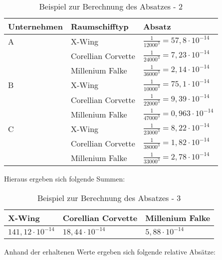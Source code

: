 \begin{table}[htb]
     \centering
     \begin{tabular}{ | l | l | l | }
          \hline
          Unternehmen & Raumschifftyp & Absatz \\
          \hline \hline
         A & X-Wing & $\frac{1}{12000^3} = 57,8 \cdot 10^{-14}$  \\
           & Corellian Corvette & $\frac{1}{24000^3} = 7,23 \cdot 10^{-14}$ \\
           & Millenium Falke & $\frac{1}{36000^3} = 2,14 \cdot 10^{-14}$ \\ \hline
         B & X-Wing & $\frac{1}{10000^3} = 75,1 \cdot 10^{-14}$ \\
           & Corellian Corvette & $\frac{1}{22000^3} = 9,39 \cdot 10^{-14}$ \\
           & Millenium Falke & $\frac{1}{47000^3} = 0,963 \cdot 10^{-14}$ \\ \hline
         C & X-Wing & $\frac{1}{23000^3} = 8,22 \cdot 10^{-14}$ \\
           & Corellian Corvette & $\frac{1}{38000^3} = 1,82 \cdot 10^{-14}$ \\
           & Millenium Falke & $\frac{1}{33000^3} = 2,78 \cdot 10^{-14}$ \\ \hline
     \end{tabular}
     \caption{Beispiel zur Berechnung des Absatzes - 2}
     \label{tab:spielwelt-logik-absatzmengen-beispiel2}
\end{table}
 
 Hieraus ergeben sich folgende Summen:
 
\begin{table}[htb]
     \centering
     \begin{tabular}{ | l | l | l | }
          \hline
          X-Wing & Corellian Corvette & Millenium Falke \\
          \hline \hline
          $141,12 \cdot 10^{-14}$ & $18,44 \cdot 10^{-14}$ &  $5,88 \cdot 10^{-14}$ \\ \hline
          
     \end{tabular}
     \caption{Beispiel zur Berechnung des Absatzes - 3}
     \label{tab:spielwelt-logik-absatzmengen-beispiel3}
\end{table} 

Anhand der erhaltenen Werte ergeben sich folgende relative Absätze:

